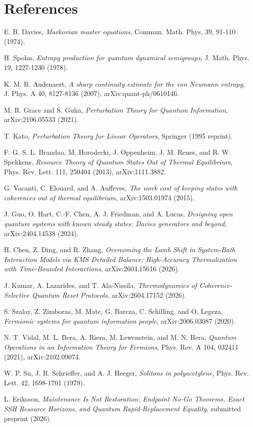 \documentclass[11pt,a4paper]{article}
\theoremstyle{remark}
\begin{document}
\section*{References}
\begin{enumerate}[label={[\arabic*]},leftmargin=2.2em]
\item E. B. Davies, \emph{Markovian master equations}, Commun. Math. Phys. 39, 91-110 (1974).
\item H. Spohn, \emph{Entropy production for quantum dynamical semigroups}, J. Math. Phys. 19, 1227-1230 (1978).
\item K. M. R. Audenaert, \emph{A sharp continuity estimate for the von Neumann entropy}, J. Phys. A 40, 8127-8136 (2007), arXiv:quant-ph/0610146.
\item M. R. Grace and S. Guha, \emph{Perturbation Theory for Quantum Information}, arXiv:2106.05533 (2021).
\item T. Kato, \emph{Perturbation Theory for Linear Operators}, Springer (1995 reprint).
\item F. G. S. L. Brandao, M. Horodecki, J. Oppenheim, J. M. Renes, and R. W. Spekkens, \emph{Resource Theory of Quantum States Out of Thermal Equilibrium}, Phys. Rev. Lett. 111, 250404 (2013), arXiv:1111.3882.
\item G. Vacanti, C. Elouard, and A. Auffeves, \emph{The work cost of keeping states with coherences out of thermal equilibrium}, arXiv:1503.01974 (2015).
\item J. Guo, O. Hart, C.-F. Chen, A. J. Friedman, and A. Lucas, \emph{Designing open quantum systems with known steady states: Davies generators and beyond}, arXiv:2404.14538 (2024).
\item H. Chen, Z. Ding, and R. Zhang, \emph{Overcoming the Lamb Shift in System-Bath Interaction Models via KMS Detailed Balance: High-Accuracy Thermalization with Time-Bounded Interactions}, arXiv:2604.15616 (2026).
\item J. Kumar, A. Lazarides, and T. Ala-Nissila, \emph{Thermodynamics of Coherence-Selective Quantum Reset Protocols}, arXiv:2604.17152 (2026).
\item S. Szalay, Z. Zimboras, M. Mate, G. Barcza, C. Schilling, and O. Legeza, \emph{Fermionic systems for quantum information people}, arXiv:2006.03087 (2020).
\item N. T. Vidal, M. L. Bera, A. Riera, M. Lewenstein, and M. N. Bera, \emph{Quantum Operations in an Information Theory for Fermions}, Phys. Rev. A 104, 032411 (2021), arXiv:2102.09074.
\item W. P. Su, J. R. Schrieffer, and A. J. Heeger, \emph{Solitons in polyacetylene}, Phys. Rev. Lett. 42, 1698-1701 (1979).
\item L. Eriksson, \emph{Maintenance Is Not Restoration: Endpoint No-Go Theorems, Exact SSH Resource Horizons, and Quantum Rapid-Replacement Equality}, submitted preprint (2026).
\end{enumerate}
\end{document}
